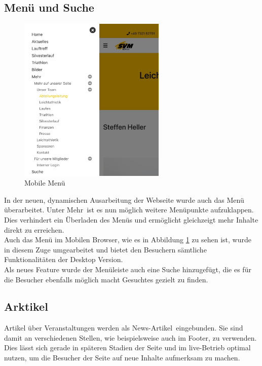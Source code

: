 \documentclass[12pt,a4paper]{article}
\begin{document}
\subsection{Menü und Suche}
\begin{figure}
  \includegraphics[width=7cm]{MenueMobile.jpeg}
  \caption{Mobile Menü}
  \label{img:MenueMobile}
\end{figure}
In der neuen, dynamischen Ausarbeitung der Webseite wurde auch das Menü überarbeitet. Unter \glqq Mehr\grqq \ ist es nun möglich weitere Menüpunkte aufzuklappen. Dies verhindert ein Überladen des Menüs und ermöglicht gleichzeigt mehr Inhalte direkt zu erreichen.\\
Auch das Menü im Mobilen Browser, wie es in Abbildung \ref{img:MenueMobile} zu sehen ist, wurde in diesem Zuge umgearbeitet und bietet den Besuchern sämtliche Funktionalitäten der Desktop Version.\\
Als neues Feature wurde der Menüleiste auch eine Suche hinzugefügt, die es für die Besucher ebenfalls möglich macht Gesuchtes gezielt zu finden.

\subsection{Arktikel}
Artikel über Veranstaltungen werden als \glqq News-Artikel\grqq \ eingebunden. Sie sind damit an verschiedenen Stellen, wie beispielsweise auch im Footer, zu verwenden. Dies lässt sich gerade in späteren Stadien der Seite und im live-Betrieb optimal nutzen, um die Besucher der Seite auf neue Inhalte aufmerksam zu machen.
\end{document}
